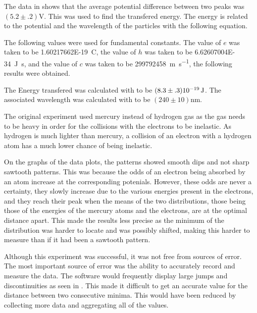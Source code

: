 \begin{paper}
The data in \figDoublet shows that the average potential difference between two peaks was $(5.2\pm.2)\si{\volt}$.
This was used to find the transfered energy.
The energy is related to the potential and the wavelength of the particles with the following equation.

\begin{paperwhere}
\end{paperwhere}

The following values were used for fundamental constants. The value of $e$ was taken to be \SI{1.60217662E-19}{\coulomb}, the value of $h$ was taken to be \SI{6.62607004E-34}{\joule\second}, and the value of $c$ was taken to be \SI{299792458}{\meter\per\second}, the following results were obtained.

The Energy transfered was calculated with \eqE to be $(8.3\pm.3)\SI{E-19}{\joule}$.
The associated wavelength was calculated with \eqE to be $(240\pm10)\si{\nano\meter}$.

The original experiment used mercury instead of hydrogen gas as the gas needs to be heavy in order for the collisions with the electrons to be inelastic.
As hydrogen is much lighter than mercury, a collision of an electron with a hydrogen atom has a much lower chance of being inelastic.

On the graphs of the data plots, the patterns showed smooth dips and not sharp sawtooth patterns.
This was because the odds of an electron being absorbed by an atom increase at the corresponding potenials.
However, these odds are never a certainty, they slowly increase due to the various energies present in the electrons, and they reach their peak when the means of the two distributions, those being those of the energies of the mercury atoms and the electrons, are at the optimal distance apart. This made the results less precise as the minimum of the distribution was harder to locate and was possibly shifted, making this harder to measure than if it had been a sawtooth pattern.


Although this experiment was successful, it was not free from sources of error.
The most important source of error was the ability to accurately record and measure the data.
The software would frequently display large jumps and discontinuities as seen in \figDataSpike.
This made it difficult to get an accurate value for the distance between two consecutive minima.
This would have been reduced by collecting more data and aggregating all of the values.


\end{paper}
